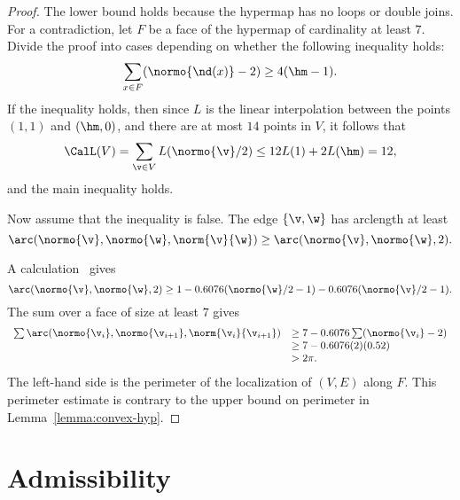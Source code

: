 \begin{proof} The lower bound holds because the hypermap has no loops
  or double joins.  For a contradiction, let $F$ be a face of the
  hypermap of cardinality at least $7$.  Divide the proof into cases
  depending on whether the following inequality holds:
\begin{displaymath}
\sum _{x\in F} (\normo{\nd(x)}-2) \ge 4(\hm-1).
\end{displaymath}
If the inequality holds, then since $L$ is the linear interpolation
between the points $(1,1)$ and $(\hm,0)$, and there are at most $14$
points in $V$, it follows that
\begin{displaymath}
\CalL(V) = \sum_{\v\in V}L(\normo{\v}/2) \le 12 L(1) + 2 L(\hm) =12,
\end{displaymath}
and the main inequality holds.

Now assume that the inequality is false.
The edge $\{\v,\w\}$ has arclength at least
\begin{displaymath}
  \arc(\normo{\v},\normo{\w},\norm{\v}{\w}) 
\ge \arc(\normo{\v},\normo{\w},2). 
\end{displaymath}

A calculation~\cite[cc:arc]{hales:2009:nonlinear} gives
\begin{displaymath}
\arc(\normo{\v},\normo{\w},2)
\ge 1 - 0.6076 (\normo{\w}/2 - 1) - 0.6076 (\normo{\v}/2 - 1).
\end{displaymath} %
The sum over a face of size at least $7$ gives
\begin{displaymath}
\begin{array}{lll}
\sum \arc(\normo{\v_i},\normo{\v_{i+1}},\norm{\v_i}{\v_{i+1}})&\ge
7 - 0.6076 \sum (\normo{\v_i}-2) \\
&\ge 7 - 0.6076 (2) (0.52) \\
&> 2\pi.
\end{array}
\end{displaymath}
The left-hand side is the perimeter of the localization of $(V,E)$
along $F$.  This perimeter estimate is contrary to the upper bound on
perimeter in Lemma~\ref{lemma:convex-hyp}.
\end{proof}




\section{Admissibility}




